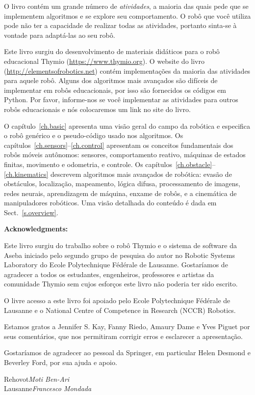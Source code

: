 O livro contém um grande número de \emph{atividades}, a maioria das quais pede que se implementem algoritmos e se explore seu comportamento. O robô que você utiliza pode não ter a capacidade de realizar todas as atividades, portanto sinta-se à vontade para adaptá-las ao seu robô.

Este livro surgiu do desenvolvimento de materiais didáticos para o robô educacional Thymio (\url{https://www.thymio.org}). O website do livro (\url{http://elementsofrobotics.net}) contém implementações da maioria das atividades para aquele robô. Alguns dos algoritmos mais avançados são difíceis de implementar em robôs educacionais, por isso  são fornecidos os códigos em Python. Por favor, informe-nos se você implementar as atividades para outros robôs educacionais e nós colocaremos um link no site do livro.

O capítulo~\ref{ch.basic} apresenta uma visão geral do campo da robótica e especifica o robô genérico e o pseudo-código usado nos algoritmos. Os capítulos~\ref{ch.sensors}--\ref{ch.control} apresentam os conceitos fundamentais dos robôs móveis autônomos: sensores, comportamento reativo, máquinas de estados finitas, movimento e odometria, e controle. Os capítulos~\ref{ch.obstacle}--\ref{ch.kinematics} descrevem algoritmos mais avançados de robótica: evasão de obstáculos, localização, mapeamento, lógica difusa, processamento de imagens, redes neurais, aprendizagem de máquina, enxame de robôs, e a cinemática de manipuladores robóticos. Uma visão detalhada do conteúdo é dada em Sect.~\ref{s.overview}.

\bigskip

\noindent\textbf{Acknowledgments:}

Este livro surgiu do trabalho sobre o robô Thymio e o sistema de software da Aseba iniciado pelo segundo grupo de pesquisa do autor no Robotic Systems Laboratory do Ecole Polytechnique F\'{e}d\'{e}rale de Lausanne. Gostaríamos de agradecer a todos os estudantes, engenheiros, professores e artistas da comunidade Thymio sem cujos esforços este livro não poderia ter sido escrito.

O livre acesso a este livro foi apoiado pelo Ecole Polytechnique F\'{e}d\'{e}rale de Lausanne e o National Centre of Competence in Research (NCCR) Robotics.

Estamos gratos a Jennifer S. Kay, Fanny Riedo, Amaury Dame e Yves Piguet por seus comentários, que nos permitiram corrigir erros e esclarecer a apresentação.

Gostaríamos de agradecer ao pessoal da Springer, em particular Helen Desmond e Beverley Ford, por sua ajuda e apoio.

\bigskip

\begin{flushright}\noindent
Rehovot\hfill {\it Moti Ben-Ari}\\
Lausanne\hfill {\it Francesco Mondada}\\
\end{flushright}
 
\tableofcontents
